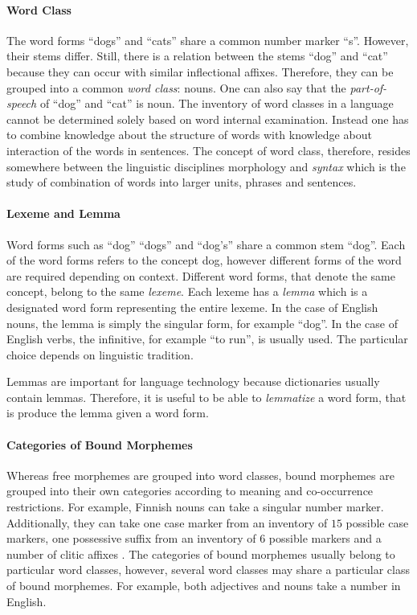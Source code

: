 \paragraph{Word Class} The word forms ``dogs'' and ``cats'' share a
common number marker ``s''. However, their stems differ. Still, there
is a relation between the stems ``dog'' and ``cat'' because they can
occur with similar inflectional affixes. Therefore, they can be
grouped into a common {\it word class}: nouns. One can also say that
the {\it part-of-speech} of ``dog'' and ``cat'' is noun.  The
inventory of word classes in a language cannot be determined solely
based on word internal examination. Instead one has to combine
knowledge about the structure of words with knowledge about
interaction of the words in sentences. The concept of word class,
therefore, resides somewhere between the linguistic disciplines
morphology and {\it syntax} which is the study of combination of words
into larger units, phrases and sentences.

\paragraph{Lexeme and Lemma} Word forms such as ``dog'' ``dogs'' and
``dog's'' share a common stem ``dog''. Each of the word forms refers
to the concept {\sc dog}, however different forms of the word are
required depending on context. Different word forms, that denote the
same concept, belong to the same {\it lexeme}. Each lexeme has a {\it
  lemma} which is a designated word form representing the entire
lexeme. In the case of English nouns, the lemma is simply the singular
form, for example ``dog''. In the case of English verbs, the
infinitive, for example ``to run'', is usually used. The particular
choice depends on linguistic tradition. 

Lemmas are important for language technology because dictionaries
usually contain lemmas. Therefore, it is useful to be able to {\it
  lemmatize} a word form, that is produce the lemma given a word form.

\paragraph{Categories of Bound Morphemes} Whereas free morphemes are
grouped into word classes, bound morphemes are grouped into their own
categories according to meaning and co-occurrence restrictions. For
example, Finnish nouns can take a singular number
marker. Additionally, they can take one case marker from an inventory
of $15$ possible case markers, one possessive suffix from an inventory
of $6$ possible markers and a number of clitic affixes
\citep{Hakulinen2004}. The categories of bound morphemes usually
belong to particular word classes, however, several word classes may
share a particular class of bound morphemes. For example, both
adjectives and nouns take a number in English.


